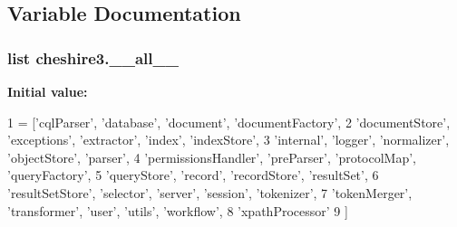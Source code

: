 \subsection{Variable Documentation}
\hypertarget{namespacecheshire3_a2738c15b18d50e7f622e448ccdc125e0}{
\subsubsection[{\-\_\-\-\_\-all\-\_\-\-\_\-}]{\setlength{\rightskip}{0pt plus 5cm}list cheshire3.\-\_\-\-\_\-all\-\_\-\-\_\-}}\label{namespacecheshire3_a2738c15b18d50e7f622e448ccdc125e0}
{\bfseries Initial value\-:}
\begin{DoxyCode}
1 = [\textcolor{stringliteral}{'cqlParser'}, \textcolor{stringliteral}{'database'}, \textcolor{stringliteral}{'document'}, \textcolor{stringliteral}{'documentFactory'},
2            \textcolor{stringliteral}{'documentStore'}, \textcolor{stringliteral}{'exceptions'}, \textcolor{stringliteral}{'extractor'}, \textcolor{stringliteral}{'index'}, \textcolor{stringliteral}{'indexStore'},
3            \textcolor{stringliteral}{'internal'}, \textcolor{stringliteral}{'logger'}, \textcolor{stringliteral}{'normalizer'}, \textcolor{stringliteral}{'objectStore'}, \textcolor{stringliteral}{'parser'},
4            \textcolor{stringliteral}{'permissionsHandler'}, \textcolor{stringliteral}{'preParser'}, \textcolor{stringliteral}{'protocolMap'}, \textcolor{stringliteral}{'queryFactory'},
5            \textcolor{stringliteral}{'queryStore'}, \textcolor{stringliteral}{'record'}, \textcolor{stringliteral}{'recordStore'}, \textcolor{stringliteral}{'resultSet'},
6            \textcolor{stringliteral}{'resultSetStore'}, \textcolor{stringliteral}{'selector'}, \textcolor{stringliteral}{'server'}, \textcolor{stringliteral}{'session'}, \textcolor{stringliteral}{'tokenizer'},
7            \textcolor{stringliteral}{'tokenMerger'}, \textcolor{stringliteral}{'transformer'}, \textcolor{stringliteral}{'user'}, \textcolor{stringliteral}{'utils'}, \textcolor{stringliteral}{'workflow'},
8            \textcolor{stringliteral}{'xpathProcessor'}
9            ]
\end{DoxyCode}
